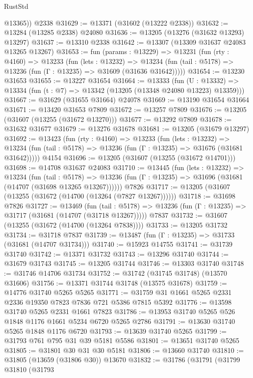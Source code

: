 \begin{lexlean}{RustStd}
\begin{coremodule}
        @13365))
    @2338
@31629 := @13371 (@31602 (@13222 @2338))
@31632 := @13284 (@13285 @2338) @24080
@31636 := @13205 (@13276 (@31632 @13293) @13297)
@31637 := @13310 @2338
@31642 := @13307 (@13309 @31637 @24083 @13265 @13267)
@31653 := fun (params : @13229) =>
  @13231
    (fun (rty : @4160) =>
    @13233
      (fun (lets : @13232) =>
      @13234 (fun (tail : @5178) => @13236 (fun (Γ : @13235) => @31609 (@31636 @31642)))))
@31654 := @13230 @31653
@31655 := @13227 @31654
@31664 := @13333
    (fun (U : @13332) => @13334 (fun (t : @7) => @13342 (@13205 (@13348 @24080 @13223) @13359)))
@31667 := @31629 (@31655 @31664) @24078
@31669 := @13190 @31654 @31664
@31671 := @13420 @31653 @7809
@31672 := @13257 @7809
@31676 := @13205 (@31607 (@13255 (@31672 @13270)))
@31677 := @13292 @7809
@31678 := @31632 @31677
@31679 := @13276 @31678
@31681 := @13205 (@31679 @13297)
@31692 := @13423
    (fun (rty : @4160) =>
    @13233
      (fun (lets : @13232) =>
      @13234 (fun (tail : @5178) => @13236 (fun (Γ : @13235) => @31676 (@31681 @31642)))))
    @4154
@31696 := @13205 (@31607 (@13255 (@31672 @14701)))
@31698 := @14708 @31637 @24083
@31710 := @13445
    (fun (lets : @13232) =>
    @13234
      (fun (tail : @5178) =>
      @13236 (fun (Γ : @13235) => @31696 (@31681 (@14707 (@31698 @13265 @13267))))))
    @7826
@31717 := @13205 (@31607 (@13255 (@31672 (@14700 (@13264 (@7827 @13267))))))
@31718 := @31698 @7826
@31727 := @13469
    (fun (tail : @5178) => @13236 (fun (Γ : @13235) => @31717 (@31681 (@14707 (@31718 @13267)))))
    @7837
@31732 := @31607 (@13255 (@31672 (@14700 (@13264 @7838))))
@31733 := @13205 @31732
@31734 := @31718 @7837
@31739 := @13487 (fun (Γ : @13235) => @31733 (@31681 (@14707 @31734)))
@31740 := @15923 @14755
@31741 := @31739 @31740
@31742 := @13371 @31732
@31743 := @13296 @31740
@31744 := @31679 @31743
@31745 := @13205 @31744
@31746 := @13303 @31740
@31748 := @31746 @14706 @31734
@31752 := @31742 (@31745 @31748) (@13570 @31606)
@31756 := @13371 @31744 @31748 (@13575 @31678)
@31759 := @14776 @31740 @5265 @5265
@31771 := @31759 @31 @1661 @5265 @2331 @2336 @19350 @7823 @7836 @721 @5386 @7815 @5392
@31776 := @13598 @31740 @5265 @2331 @1661 @7823
@31786 := @13953 @31740 @5265 @526 @1848 @1176 @1661 @5234 @6720 @5265 @2786
@31791 := @13630 @31740 @5265 @1848 @1176 @6720
@31793 := @13639 @31740 @5265
@31799 := @31793 @761 @795 @31 @39 @5181 @5586
@31801 := @13651 @31740 @5265
@31805 := @31801 @30 @31 @30 @5181
@31806 := @13660 @31740
@31810 := @31805 (@13659 (@31806 @30)) @13670
@31832 := @31786
    (@31791
      (@31799
        @31810
        (@31793

\end{coremodule}
\end{lexlean}
